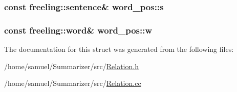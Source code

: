 \subsubsection[{s}]{\setlength{\rightskip}{0pt plus 5cm}const freeling\+::sentence\& word\+\_\+pos\+::s}\label{structword__pos_a18b13ee20fa43f3e038f76202f5e2f6e}
\hypertarget{structword__pos_a9268eca742d764f0900d4bfcf7c2720e}{}
\subsubsection[{w}]{\setlength{\rightskip}{0pt plus 5cm}const freeling\+::word\& word\+\_\+pos\+::w}\label{structword__pos_a9268eca742d764f0900d4bfcf7c2720e}


The documentation for this struct was generated from the following files\+:\begin{DoxyCompactItemize}
\item 
/home/samuel/\+Summarizer/src/\hyperlink{Relation_8h}{Relation.\+h}\item 
/home/samuel/\+Summarizer/src/\hyperlink{Relation_8cc}{Relation.\+cc}\end{DoxyCompactItemize}
